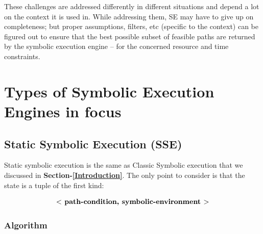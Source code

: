 \documentclass[11pt]{llncs}
\begin{document}
	These challenges are addressed differently in different situations and depend a lot on the context it is used in. While addressing them, SE may have to give up on completeness; but proper assumptions, filters, etc (specific to the context) can be figured out to ensure that the best possible subset of feasible paths are returned by the symbolic execution engine – for the concerned resource and time constraints.



\section{Types of Symbolic Execution Engines in focus}
	\subsection{Static Symbolic Execution (SSE)}
		Static symbolic execution is the same as Classic Symbolic execution that we discussed in \textbf{Section-\ref{Introduction}}. The only point to consider is that the state is a tuple of the first kind:

		\vspace{-4mm}
	
		\begin{equation}
			\textbf{$ < $ path-condition, symbolic-environment $ > $}
		\end{equation}

		\vspace{-4mm}

		\subsubsection{Algorithm}

			~
			\vspace{2mm}
\end{document}

